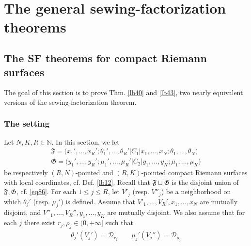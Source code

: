 \documentclass[11pt,b5paper,notitlepage]{article}
\theoremstyle{definition}
\theoremstyle{plain}
\newcommand{\fk}{\mathfrak}
\newcommand{\Nbb}{\mathbb N}
\newcommand{\<}{\left\langle}
\renewcommand{\>}{\right\rangle}
\newcommand{\MD}{\mathcal{D}}
\newcommand{\ff}{\mathfrak{F}}
\newcommand{\fg}{\mathfrak{G}}
\numberwithin{equation}{section}
\begin{document}
\section{The general sewing-factorization theorems}







\subsection{The SF theorems for compact Riemann surfaces}

The goal of this section is to prove Thm. \ref{lb40} and \ref{lb43}, two nearly equivalent versions of the sewing-factorization theorem.


\subsubsection{The setting}\label{lb44}

Let $N,K,R\in\Nbb$. In this section, we let 
\begin{gather*}
\fk F=\big(x_1',\dots,x_R'; \theta_1',\dots,\theta_R'\big|C_1\big|x_1,\dots,x_N;\theta_1,\dots,\theta_N\big)\\
\fk G=\big(y_1',\dots,y_R';\mu_1',\dots,\mu_R'\big|C_2\big| y_1,\dots,y_K;\mu_1,\dots,\mu_K \big)
    \end{gather*}
be respectively $(R,N)$-pointed and $(R,K)$-pointed compact Riemann surfaces with local coordinates, cf. Def. \ref{lb12}. Recall that $\ff\sqcup\fg$ is the disjoint union of $\ff,\fg$, cf. \eqref{eq86}. For each $1\leq j\leq R$, let $V'_j$ (resp. $V''_j$) be a neighborhood on which $\theta_j'$ (resp. $\mu_j'$) is defined. Assume that $V'_1,\dots,V_R',x_1,\dots,x_N$ are mutually disjoint, and $V''_1,\dots,V_R'',y_1,\dots,y_K$ are mutually disjoint. We also assume that for each $j$ there exist $r_j,\rho_j\in(0,+\infty]$ such that
\begin{align}
\theta_j'(V_j')=\MD_{r_j}\qquad \mu_j'(V_j'')=\MD_{\rho_j}
\end{align} 
\end{document}
